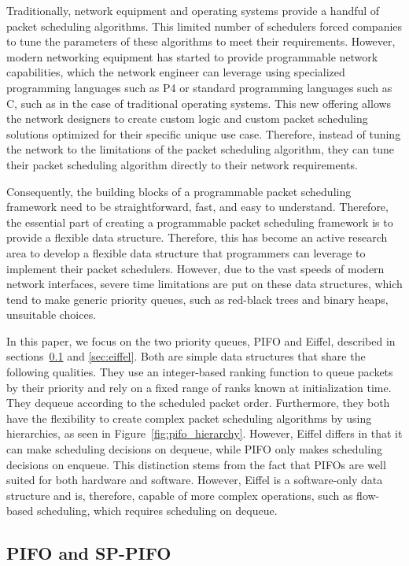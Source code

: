 \documentclass[sigconf, nonacm]{acmart}
\begin{document}
Traditionally, network equipment and operating systems provide a handful of packet scheduling algorithms. This limited number of schedulers forced companies to tune the parameters of these algorithms to meet their requirements. However, modern networking equipment has started to provide programmable network capabilities, which the network engineer can leverage using specialized programming languages such as P4\cite{p4} or standard programming languages such as C, such as in the case of traditional operating systems. This new offering allows the network designers to create custom logic and custom packet scheduling solutions optimized for their specific unique use case. Therefore, instead of tuning the network to the limitations of the packet scheduling algorithm, they can tune their packet scheduling algorithm directly to their network requirements.

Consequently, the building blocks of a programmable packet scheduling framework need to be straightforward, fast, and easy to understand. Therefore, the essential part of creating a programmable packet scheduling framework is to provide a flexible data structure. Therefore, this has become an active research area to develop a flexible data structure that programmers can leverage to implement their packet schedulers. However, due to the vast speeds of modern network interfaces, severe time limitations are put on these data structures, which tend to make generic priority queues, such as red-black trees and binary heaps, unsuitable choices.

In this paper, we focus on the two priority queues, PIFO and Eiffel, described in sections~\ref{sec:pifo} and \ref{sec:eiffel}. Both are simple data structures that share the following qualities. They use an integer-based ranking function to queue packets by their priority and rely on a fixed range of ranks known at initialization time. They dequeue according to the scheduled packet order. Furthermore, they both have the flexibility to create complex packet scheduling algorithms by using hierarchies, as seen in Figure~\ref{fig:pifo_hierarchy}. However, Eiffel differs in that it can make scheduling decisions on dequeue, while PIFO only makes scheduling decisions on enqueue. This distinction stems from the fact that PIFOs are well suited for both hardware and software. However, Eiffel is a software-only data structure and is, therefore, capable of more complex operations, such as flow-based scheduling, which requires scheduling on dequeue.


\subsection{PIFO and SP-PIFO} \label{sec:pifo}
\end{document}
